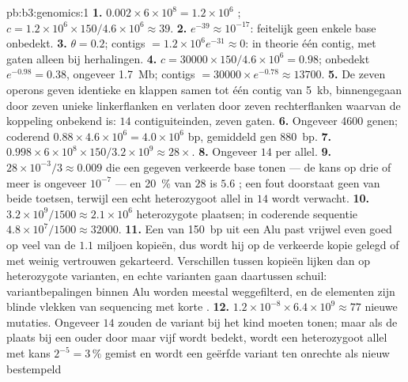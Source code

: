 \begin{solution}{pb:b3:genomics:1}
\textbf{1.} $0.002\times 6\times 10^{8} = 1.2\times 10^{6}$ ;
$c = 1.2\times 10^{6}\times 150/4.6\times 10^{6} \approx 39$.
\textbf{2.} $e^{-39} \approx 10^{-17}$: feitelijk geen enkele base
onbedekt.
\textbf{3.} $\theta = 0.2$; contigs $= 1.2\times 10^{6} e^{-31} \approx
0$: in theorie één contig, met gaten alleen bij herhalingen.
\textbf{4.} $c = \num{30000}\times 150/4.6\times 10^{6} = 0.98$;
onbedekt $e^{-0.98} = 0.38$, ongeveer \qty{1.7}{Mb}; contigs $= \num{30000}
\times e^{-0.78} \approx \num{13700}$.
\textbf{5.} De zeven operons geven identieke  en klappen samen tot
één contig van \qty{5}{kb}, binnengegaan door zeven unieke linkerflanken
en verlaten door zeven rechterflanken waarvan de koppeling onbekend is:
$14$ contiguiteinden, zeven gaten.
\textbf{6.} Ongeveer \num{4600} genen; coderend $0.88\times 4.6\times 10^{6}
= 4.0\times 10^{6}$ bp, gemiddeld gen \qty{880}{bp}.
\textbf{7.} $0.998\times 6\times 10^{8}\times 150/3.2\times 10^{9}
\approx 28\times$.
\textbf{8.} Ongeveer $14$  per allel.
\textbf{9.} $28\times 10^{-3}/3 \approx 0.009$  die een gegeven
verkeerde base tonen --- de kans op drie of meer is ongeveer $10^{-7}$
--- en \qty{20}{\%} van $28$ is $5.6$ ; een fout doorstaat geen van
beide toetsen, terwijl een echt heterozygoot allel in $14$  wordt
verwacht.
\textbf{10.} $3.2\times 10^{9}/1500 \approx 2.1\times 10^{6}$
heterozygote plaatsen; in coderende sequentie $4.8\times 10^{7}/1500 \approx
\num{32000}$.
\textbf{11.} Een  van \qty{150}{bp} uit een Alu past vrijwel even
goed op veel van de $1.1$ miljoen kopieën, dus wordt hij op de verkeerde
kopie gelegd of met weinig vertrouwen gekarteerd. Verschillen tussen
kopieën lijken dan op heterozygote varianten, en echte varianten gaan
daartussen schuil: variantbepalingen binnen Alu worden meestal
weggefilterd, en de elementen zijn blinde vlekken van sequencing met
korte .
\textbf{12.} $1.2\times 10^{-8}\times 6.4\times 10^{9} \approx 77$
nieuwe mutaties. Ongeveer $14$  zouden de variant bij het kind
moeten tonen; maar als de plaats bij een ouder door maar vijf 
wordt bedekt, wordt een heterozygoot allel met kans $2^{-5} = 3\,\%$
gemist en wordt een geërfde variant ten onrechte als nieuw bestempeld

\end{solution}
